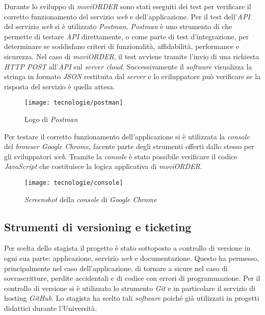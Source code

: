 Durante lo sviluppo di \textit{moviORDER} sono stati eseguiti dei test per verificare il corretto funzionamento del servizio \textit{web} e dell'applicazione. Per il test dell'\textit{API} del servizio \textit{web} si è utilizzato \textit{Postman}. \textit{Postman} è uno strumento di  che permette di testare \textit{API} direttamente, o come parte di test d'integrazione, per determinare se soddisfano criteri di funzionalità, affidabilità, performance e sicurezza. Nel caso di \textit{moviORDER}, il test avviene tramite l'invio di una richiesta \textit{HTTP POST} all'\textit{API} sul \textit{server cloud}. Successivamente il \textit{software} visualizza la stringa in formato \textit{JSON} restituita dal \textit{server} e lo sviluppatore può verificare se la risposta del servizio è quella attesa.

\begin{figure}[!h] 
    \centering 
    \texttt{[image: tecnologie/postman]} 
    \caption{Logo di \textit{Postman}}
\end{figure}

Per testare il corretto funzionamento dell'applicazione si è utilizzata la \textit{console} del \textit{browser Google Chrome}, facente parte degli strumenti offerti dallo stesso per gli sviluppatori \textit{web}. Tramite la \textit{console} è stato possibile verificare il codice \textit{JavaScript} che costituisce la logica applicativa di \textit{moviORDER}.

\begin{figure}[!h] 
    \centering 
    \texttt{[image: tecnologie/console]} 
    \caption{\textit{Screenshot} della \textit{console} di \textit{Google Chrome}}
\end{figure}

\newpage

\subsection{Strumenti di versioning e ticketing}

Per scelta dello stagista il progetto è stato sottoposto a controllo di versione in ogni sua parte: applicazione, servizio \textit{web} e documentazione. Questo ha permesso, principalmente nel caso dell'applicazione, di tornare a  sicure nel caso di sovrascritture, perdite accidentali e  di codice con errori di programmazione. Per il controllo di versione si è utilizzato lo strumento \textit{Git} e in particolare il servizio di hosting \textit{GitHub}. Lo stagista ha scelto tali \textit{software} poiché già utilizzati in progetti didattici durante l'Università.

